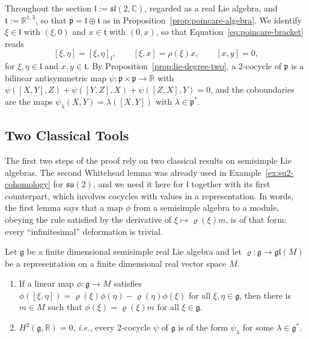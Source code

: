 	Throughout the section $\mathfrak{l}:=\mathfrak{sl}(2,\mathbb{C})$, regarded as a real Lie algebra, and $\mathfrak{t}:=\mathbb{R}^{1,3}$, so that $\mathfrak{p}=\mathfrak{l}\oplus\mathfrak{t}$ as in Proposition~\ref{prop:poincare-algebra}. We identify $\xi\in\mathfrak{l}$ with $(\xi,0)$ and $x\in\mathfrak{t}$ with $(0,x)$, so that Equation~\eqref{eq:poincare-bracket} reads
	\begin{equation}\label{eq:semidirect-brackets}
		[\xi,\eta]=[\xi,\eta]_{\mathfrak{l}},\qquad [\xi,x]=\rho(\xi)x,\qquad [x,y]=0,
	\end{equation}
	for $\xi,\eta\in\mathfrak{l}$ and $x,y\in\mathfrak{t}$. By Proposition~\ref{prop:lie-degree-two}, a $2$-cocycle of $\mathfrak{p}$ is a bilinear antisymmetric map $\psi:\mathfrak{p}\times\mathfrak{p}\to\mathbb{R}$ with $\psi([X,Y],Z)+\psi([Y,Z],X)+\psi([Z,X],Y)=0$, and the coboundaries are the maps $\psi_\lambda(X,Y)=\lambda([X,Y])$ with $\lambda\in\mathfrak{p}^*$.
	
	\subsection*{Two Classical Tools}
	
	The first two steps of the proof rely on two classical results on semisimple Lie algebras. The second Whitehead lemma was already used in Example~\ref{ex:su2-cohomology} for $\mathfrak{su}(2)$, and we need it here for $\mathfrak{l}$ together with its first counterpart, which involves cocycles with values in a representation. In words, the first lemma says that a map $\phi$ from a semisimple algebra to a module, obeying the rule satisfied by the derivative of $\xi\mapsto\varrho(\xi)m$, is of that form: every ``infinitesimal'' deformation is trivial.
	
	\begin{theorem}\label{thm:whitehead}
		Let $\mathfrak{g}$ be a finite dimensional semisimple real Lie algebra and let $\varrho:\mathfrak{g}\to\mathfrak{gl}(M)$ be a representation on a finite dimensional real vector space $M$.
		\begin{enumerate}
			\item If a linear map $\phi:\mathfrak{g}\to M$ satisfies $\phi([\xi,\eta])=\varrho(\xi)\phi(\eta)-\varrho(\eta)\phi(\xi)$ for all $\xi,\eta\in\mathfrak{g}$, then there is $m\in M$ such that $\phi(\xi)=\varrho(\xi)m$ for all $\xi\in\mathfrak{g}$.
			\item $H^2(\mathfrak{g},\mathbb{R})=0$, \textit{i.e.}, every $2$-cocycle $\psi$ of $\mathfrak{g}$ is of the form $\psi_\lambda$ for some $\lambda\in\mathfrak{g}^*$.
		\end{enumerate}
	\end{theorem}
	
